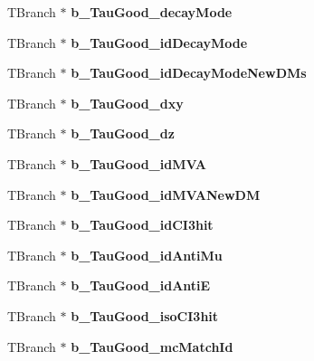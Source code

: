 \begin{DoxyCompactItemize}
T\+Branch $\ast$ {\bfseries b\+\_\+\+Tau\+Good\+\_\+decay\+Mode}
\item 
\hypertarget{classMiniTree_adf27dd7ceb1945a90aca729673893501}{}\label{classMiniTree_adf27dd7ceb1945a90aca729673893501} 
T\+Branch $\ast$ {\bfseries b\+\_\+\+Tau\+Good\+\_\+id\+Decay\+Mode}
\item 
\hypertarget{classMiniTree_a595667ed47ccc01610808d02c62f5d8e}{}\label{classMiniTree_a595667ed47ccc01610808d02c62f5d8e} 
T\+Branch $\ast$ {\bfseries b\+\_\+\+Tau\+Good\+\_\+id\+Decay\+Mode\+New\+D\+Ms}
\item 
\hypertarget{classMiniTree_a081655b6baa90055f8577b558587521f}{}\label{classMiniTree_a081655b6baa90055f8577b558587521f} 
T\+Branch $\ast$ {\bfseries b\+\_\+\+Tau\+Good\+\_\+dxy}
\item 
\hypertarget{classMiniTree_ae02ea8e6ee3959690bcfe6101f0b0630}{}\label{classMiniTree_ae02ea8e6ee3959690bcfe6101f0b0630} 
T\+Branch $\ast$ {\bfseries b\+\_\+\+Tau\+Good\+\_\+dz}
\item 
\hypertarget{classMiniTree_a31b6c494955900e101efd1f04488e330}{}\label{classMiniTree_a31b6c494955900e101efd1f04488e330} 
T\+Branch $\ast$ {\bfseries b\+\_\+\+Tau\+Good\+\_\+id\+M\+VA}
\item 
\hypertarget{classMiniTree_a66a94a3b3bf51c9ab874deddf911114d}{}\label{classMiniTree_a66a94a3b3bf51c9ab874deddf911114d} 
T\+Branch $\ast$ {\bfseries b\+\_\+\+Tau\+Good\+\_\+id\+M\+V\+A\+New\+DM}
\item 
\hypertarget{classMiniTree_ad34e95ccc3a0eecbf0f792798cc0e6b5}{}\label{classMiniTree_ad34e95ccc3a0eecbf0f792798cc0e6b5} 
T\+Branch $\ast$ {\bfseries b\+\_\+\+Tau\+Good\+\_\+id\+C\+I3hit}
\item 
\hypertarget{classMiniTree_af9a2f8b3d2f1e0b1894f5bb5f54e4c16}{}\label{classMiniTree_af9a2f8b3d2f1e0b1894f5bb5f54e4c16} 
T\+Branch $\ast$ {\bfseries b\+\_\+\+Tau\+Good\+\_\+id\+Anti\+Mu}
\item 
\hypertarget{classMiniTree_ad303bc42ca9120ea3ecce97758b199c1}{}\label{classMiniTree_ad303bc42ca9120ea3ecce97758b199c1} 
T\+Branch $\ast$ {\bfseries b\+\_\+\+Tau\+Good\+\_\+id\+AntiE}
\item 
\hypertarget{classMiniTree_ad1c6c34fcf9318c85eac4348f3329267}{}\label{classMiniTree_ad1c6c34fcf9318c85eac4348f3329267} 
T\+Branch $\ast$ {\bfseries b\+\_\+\+Tau\+Good\+\_\+iso\+C\+I3hit}
\item 
\hypertarget{classMiniTree_aeb67f1bd60feeb386dbd28b0cab148cd}{}\label{classMiniTree_aeb67f1bd60feeb386dbd28b0cab148cd} 
T\+Branch $\ast$ {\bfseries b\+\_\+\+Tau\+Good\+\_\+mc\+Match\+Id}

\end{DoxyCompactItemize}
